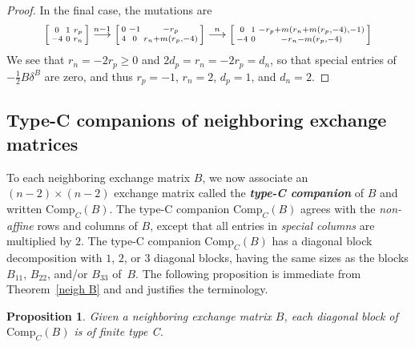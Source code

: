\documentclass{amsart}
\newtheorem{proposition}{Proposition}[section]
\theoremstyle{definition}
\theoremstyle{remark}
\numberwithin{equation}{section}
\newcommand{\newword}[1]{\textbf{\emph{#1}}}
\newcommand{\0}{{\mathbf{0}}}
\newcommand{\Comp}{\mathrm{Comp}_C}
\begin{document}
\begin{proof}
In the final case, the mutations are
\[\begin{bsmallmatrix*}
0 & 1 & r_p\\
-4 & 0 &r_n
\end{bsmallmatrix*}\overset{n-1}{\longrightarrow} 
\begin{bsmallmatrix*}
0 & -1 & -r_p\\
4 & 0 &r_n+m(r_p,-4)
\end{bsmallmatrix*}\overset{n}{\longrightarrow} 
\begin{bsmallmatrix*}
0 & 1 &-r_p+m(r_n+m(r_p,-4),-1)\\
-4 & 0 &-r_n-m(r_p,-4)
\end{bsmallmatrix*}
\]
We see that $r_n=-2r_p\ge0$ and $2d_p=r_n=-2r_p=d_n$, so that special entries of~$-\frac12B\delta^B$ are zero, and thus $r_p=-1$, $r_n=2$, $d_p=1$, and $d_n=2$.
\end{proof}

\subsection{Type-C companions of neighboring exchange matrices}\label{type C}
To each neighboring exchange matrix $B$, we now associate an $(n-2)\times(n-2)$ exchange matrix called the \newword{type-C companion} of $B$ and written $\Comp(B)$.
The type-C companion $\Comp(B)$ agrees with the \emph{non-affine} rows and columns of $B$, except that all entries in \emph{special columns} are multiplied by $2$.
The type-C companion $\Comp(B)$ has a diagonal block decomposition with $1$, $2$, or $3$ diagonal blocks, having the same sizes as the blocks $B_{11}$, $B_{22}$, and/or $B_{33}$ of~$B$.
The following proposition is immediate from Theorem~\ref{neigh B} and \cite[Proposition~3.3]{NS14} and justifies the terminology.

\begin{proposition}\label{Comp is C}
Given a neighboring exchange matrix $B$, each diagonal block of $\Comp(B)$ is of finite type C.
\end{proposition}
%
\end{document}
